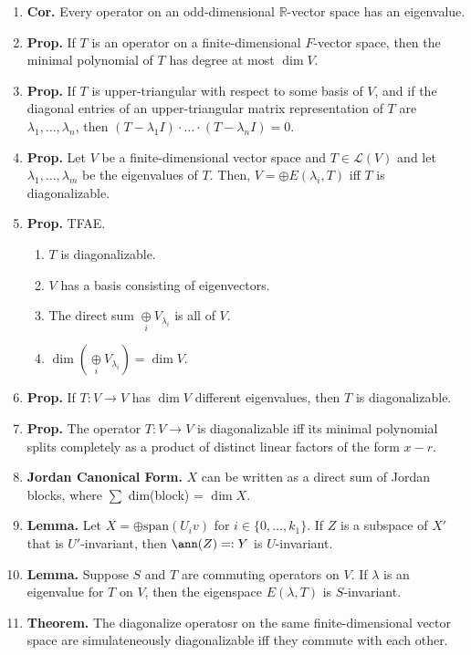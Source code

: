 \begin{enumerate}
	\item \textbf{Cor. } Every operator on an odd-dimensional $\mathbb{R}$-vector space has an eigenvalue. 
	\item \textbf{Prop. } If $T$ is an operator on a finite-dimensional $F$-vector space, then the minimal polynomial of $T$ has degree at most $\dim V$. 
	\item \textbf{Prop. } If $T$ is upper-triangular with respect to some basis of $V$, and if the diagonal entries of an upper-triangular matrix representation of $T$ are $\lambda_1,\dots,\lambda_n$, then $(T-\lambda_1I) \cdot \dots \cdot (T-\lambda_nI)=0$. 
	\item \textbf{Prop. } Let $V$ be a finite-dimensional vector space and $T \in \mathscr{L}(V)$ and let $\lambda_1,\dots,\lambda_m$ be the eigenvalues of $T$. Then, $V = \oplus E(\lambda_i, T)$ iff $T$ is diagonalizable. 
	\item \textbf{Prop. } TFAE. 
	\begin{enumerate}
		\item $T$ is diagonalizable. 
		\item $V$ has a basis consisting of eigenvectors. 
		\item The direct sum $\underset{i}{\oplus} V_{\lambda_i}$ is all of $V$. 
		\item $\dim \left(\underset{i}{\oplus} V_{\lambda_i} \right) = \dim V$. 
	\end{enumerate}
	\item \textbf{Prop. } If $T: V \to V$ has $\dim V$ different eigenvalues, then $T$ is diagonalizable. 
	\item \textbf{Prop. } The operator $T: V \to V$ is diagonalizable iff its minimal polynomial splits completely as a product of distinct linear factors of the form $x-r$. 
	\item \textbf{Jordan Canonical Form. } $X$ can be written as a direct sum of Jordan blocks, where $\sum$ dim(block) = $\dim X$. 
	\item \textbf{Lemma. } Let $X = \oplus \textrm{span}(U_iv)$ for $i \in \{0,\dots,k_1\}$. If $Z$ is a subspace of $X'$ that is $U'$-invariant, then $\ann(Z) =: Y$ is $U$-invariant. 
	\item \textbf{Lemma. } Suppose $S$ and $T$ are commuting operators on $V$. If $\lambda$ is an eigenvalue for $T$ on $V$, then the eigenspace $E(\lambda, T)$ is $S$-invariant. 
	\item \textbf{Theorem. } The diagonalize operatosr on the same finite-dimensional vector space are simulateneously diagonalizable iff they commute with each other. 

\end{enumerate}
